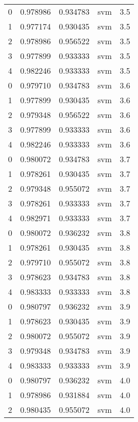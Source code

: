 \begin{tabular}{rrrlr}
     0 & 0.978986 & 0.934783 &      svm &        3.5 \\
     1 & 0.977174 & 0.930435 &      svm &        3.5 \\
     2 & 0.978986 & 0.956522 &      svm &        3.5 \\
     3 & 0.977899 & 0.933333 &      svm &        3.5 \\
     4 & 0.982246 & 0.933333 &      svm &        3.5 \\
     0 & 0.979710 & 0.934783 &      svm &        3.6 \\
     1 & 0.977899 & 0.930435 &      svm &        3.6 \\
     2 & 0.979348 & 0.956522 &      svm &        3.6 \\
     3 & 0.977899 & 0.933333 &      svm &        3.6 \\
     4 & 0.982246 & 0.933333 &      svm &        3.6 \\
     0 & 0.980072 & 0.934783 &      svm &        3.7 \\
     1 & 0.978261 & 0.930435 &      svm &        3.7 \\
     2 & 0.979348 & 0.955072 &      svm &        3.7 \\
     3 & 0.978261 & 0.933333 &      svm &        3.7 \\
     4 & 0.982971 & 0.933333 &      svm &        3.7 \\
     0 & 0.980072 & 0.936232 &      svm &        3.8 \\
     1 & 0.978261 & 0.930435 &      svm &        3.8 \\
     2 & 0.979710 & 0.955072 &      svm &        3.8 \\
     3 & 0.978623 & 0.934783 &      svm &        3.8 \\
     4 & 0.983333 & 0.933333 &      svm &        3.8 \\
     0 & 0.980797 & 0.936232 &      svm &        3.9 \\
     1 & 0.978623 & 0.930435 &      svm &        3.9 \\
     2 & 0.980072 & 0.955072 &      svm &        3.9 \\
     3 & 0.979348 & 0.934783 &      svm &        3.9 \\
     4 & 0.983333 & 0.933333 &      svm &        3.9 \\
     0 & 0.980797 & 0.936232 &      svm &        4.0 \\
     1 & 0.978986 & 0.931884 &      svm &        4.0 \\
     2 & 0.980435 & 0.955072 &      svm &        4.0 \\

\end{tabular}
